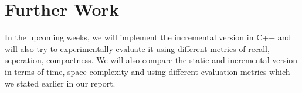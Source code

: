 \documentclass[acmsmall]{acmart}
\begin{document}
\section*{Further Work}
In the upcoming weeks, we will implement the incremental version in C++ and will also try to experimentally evaluate it using different metrics of recall, seperation, compactness. We will also compare the static and incremental version in terms of time, space complexity and using different evaluation metrics which we stated earlier in our report. 
\end{document}
